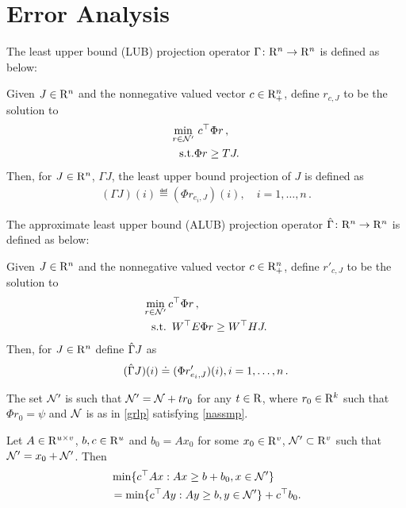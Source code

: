 \section{Error Analysis}\label{sec:errana}
The least upper bound (LUB) projection operator $\Gamma \colon \mathrm{R}^n \rightarrow\mathrm{R}^n$ is defined as below:
\begin{definition}\label{lubpop}
Given $J\in \mathrm{R}^n$ and the nonnegative valued vector $c\in \mathrm{R}^n_+$, define $r_{c,J}$ to be the solution to 
\begin{align}
\label{lubplp}
\begin{split}
 \underset{r\in \N'}{\min} &\,\, c^\top \Phi r\,,\\
 \text{s.t.}& \mb \Phi r\geq  TJ.
 \end{split}
\end{align}
Then, for $J\in \mathrm{R}^n$, $\Gamma J$,
the least upper bound projection of $J$ is defined as 
\begin{align}\label{gamdef}
(\Gamma J)(i)\eqdef(\Phi r_{e_i,J})(i),\quad i=1,\ldots,n\,.
\end{align}
\end{definition}
The approximate least upper bound (ALUB) projection operator $\hat{\Gamma} \colon \mathrm{R}^n \rightarrow \mathrm{R}^n$ is defined as below:
\begin{definition}\label{alubpop}
Given $J\in \mathrm{R}^n$ and the nonnegative valued vector $c\in \mathrm{R}^n_+$, define $r'_{c,J}$ to be the solution to 
\begin{align}\label{alubplp}
 \underset{r\in \N'}{\min}& \,\mb c^\top \Phi r\,,\nn\\
 \text{s.t.}& \,\,\, W^\top E \Phi r\geq W^\top HJ.
\end{align}
Then, for $J\in \mathrm{R}^n$ define $\hat{\Gamma} J$  as 
\begin{align}\label{tgamdef}
(\hg J)(i)\eqdef(\Phi r'_{e_i,J})(i), \mb i=1,\ldots,n\,.
\end{align}
\end{definition}
\begin{assumption}\label{ass:n4}
The set $\mathcal{N}'$ is such that $\mathcal{N}' = \mathcal{N} + t r_0$ for any $t\in \mathrm{R}$, where $r_0\in \mathrm{R}^k$ such that $\Phi r_0 = \psi$ and $\mathcal{N}$ is as in \eqref{grlp} satisfying \cref{nassmp}.
\end{assumption}
\begin{lemma}\label{lpsol}
Let $A\in \mathrm{R}^{u\times v}$, $b,c\in \mathrm{R}^u$ and $b_0=Ax_0$ for 
some $x_0 \in \mathrm{R}^v$, $\mathcal{N}' \subset \mathrm{R}^v$ such that $\mathcal{N}' =x_0+ \mathcal{N}'$. Then
\begin{align}
&\min\{c^\top Ax:Ax\geq b+b_0, x\in \mathcal{N}'\} \nonumber\\
&=\min\{c^\top A y:Ay \geq b, y \in \mathcal{N}' \}+c^\top b_0.
\end{align}
\end{lemma}
